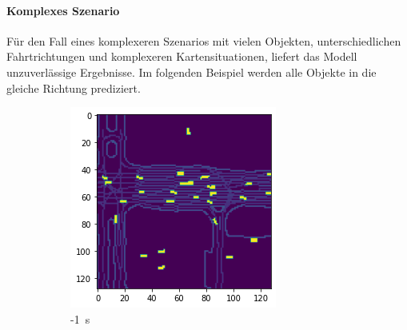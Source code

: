 \documentclass[12pt]{article}
\begin{document}
    \pagebreak
    \paragraph{Komplexes Szenario} Für den Fall eines komplexeren Szenarios mit vielen Objekten, unterschiedlichen Fahrtrichtungen und komplexeren Kartensituationen, liefert das Modell unzuverlässige Ergebnisse.
    Im folgenden Beispiel werden alle Objekte in die gleiche Richtung prediziert. 

    \begin{figure}[H]
        \centering
        \begin{subfigure}[b]{0.18\textwidth}
            \includegraphics[width=\textwidth]{output_opposite_0.png}
            \caption{-1~s}
        \end{subfigure}
        ~
        \begin{subfigure}[b]{0.18\textwidth}

\end{subfigure}
\end{figure}
\end{document}

